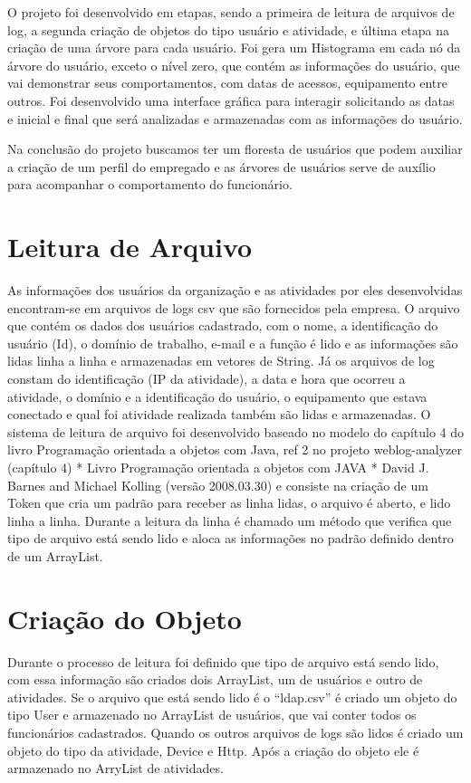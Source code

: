 \documentclass[12pt]{article}
\begin{document}
O projeto foi desenvolvido em etapas, sendo a primeira de leitura de arquivos de log, a segunda criação de objetos do tipo usuário  e atividade, e última etapa na criação de uma árvore para cada usuário. Foi gera um Histograma em cada nó da árvore do usuário, exceto o nível zero, que contém as informações do usuário, que vai demonstrar seus  comportamentos, com datas de acessos, equipamento entre outros. Foi desenvolvido uma interface gráfica para interagir solicitando as datas e inicial e final que será analizadas e armazenadas com as informações do usuário.

Na conclusão do projeto buscamos ter um floresta de usuários que podem auxiliar a criação de um perfil do empregado e as árvores de usuários serve de auxílio para acompanhar o comportamento do  funcionário.

\section{Leitura de Arquivo} \label{sec:firstpage}

As informações dos usuários da organização e as atividades por eles desenvolvidas encontram-se em arquivos de logs csv que são fornecidos pela empresa. O arquivo que contém os dados  dos usuários cadastrado, com o nome, a identificação do usuário (Id), o domínio de trabalho, e-mail e a função é lido e as informações são lidas linha a linha e armazenadas em vetores de String. Já os arquivos de log constam do identificação (IP da atividade), a data e hora que ocorreu a atividade, o domínio e a identificação do usuário, o equipamento que estava conectado e qual foi atividade realizada também são lidas e armazenadas. 
O sistema de leitura de arquivo foi desenvolvido baseado no modelo do capítulo 4 do livro Programação orientada a objetos com Java, ref 2 no projeto weblog-analyzer (capítulo 4)
 * Livro Programação orientada a objetos com JAVA 
 * David J. Barnes and Michael Kolling (versão 2008.03.30) 
e consiste na criação de um Token que cria um padrão para receber as linha lidas, o arquivo é aberto, e lido linha a linha. Durante a leitura da linha é chamado um método que verifica que tipo de arquivo está sendo lido e aloca as informações no padrão definido dentro de um ArrayList.

\section{Criação do Objeto}

Durante o processo de leitura foi definido que tipo de arquivo está sendo lido, com essa informação são criados dois ArrayList, um de usuários e outro de atividades. Se o arquivo que está sendo lido é o “ldap.csv” é criado um objeto do tipo User e armazenado no ArrayList de usuários, que vai conter todos os funcionários cadastrados. Quando os outros arquivos de logs são lidos é criado um objeto do tipo da atividade, Device e Http. Após a criação do objeto ele é armazenado no ArryList de atividades.
\end{document}
